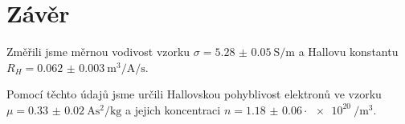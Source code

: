\section*{Závěr}
Změřili jsme měrnou vodivost vzorku $\sigma = \SI{5.28(5)}{\siemens\per\meter}$ a Hallovu konstantu $R_H = \SI{0.062(3)}{\meter\cubed\per\ampere\per\second}$.

Pomocí těchto údajů jsme určili Hallovskou pohyblivost elektronů ve vzorku $\mu = \SI{0.33(2)}{\ampere\second\squared\per\kg}$ a jejich koncentraci $n = \num{1.18(6)} \cdot \SI{e20}{\per\metre\cubed}$.